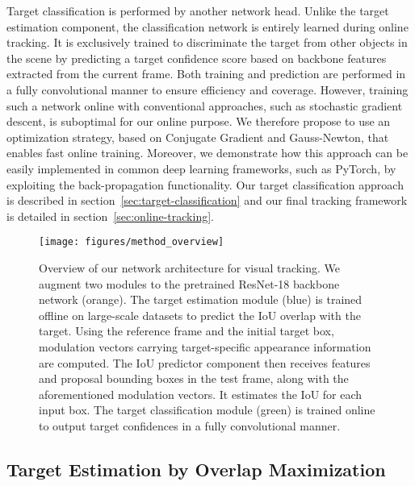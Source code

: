 \documentclass[10pt,twocolumn,letterpaper]{article}
\begin{document}
Target classification is performed by another network head. Unlike the target estimation component, the classification network is entirely learned during online tracking. It is exclusively trained to discriminate the target from other objects in the scene by predicting a target confidence score based on backbone features extracted from the current frame. Both training and prediction are performed in a fully convolutional manner to ensure efficiency and coverage. However, training such a network online with conventional approaches, such as stochastic gradient descent, is suboptimal for our online purpose. We therefore propose to use an optimization strategy, based on Conjugate Gradient and Gauss-Newton, that enables fast online training. Moreover, we demonstrate how this approach can be easily implemented in common deep learning frameworks, such as PyTorch, by exploiting the back-propagation functionality. Our target classification approach is described in section~\ref{sec:target-classification} and our final tracking framework is detailed in section~\ref{sec:online-tracking}.

\begin{figure}[t]
	\centering \newcommand{\wid}{1.0\columnwidth}\texttt{[image: figures/method\_overview]}\vspace{-3mm}\caption{Overview of our network architecture for visual tracking. We augment two modules to the pretrained ResNet-18 backbone network (orange). The target estimation module (blue) is trained offline on large-scale datasets to predict the IoU overlap with the target. Using the reference frame and the initial target box, modulation vectors carrying target-specific appearance information are computed. The IoU predictor component then receives features and proposal bounding boxes in the test frame, along with the aforementioned modulation vectors. It estimates the IoU for each input box. The target classification module (green) is trained online to output target confidences in a fully convolutional manner.}\label{fig:method_overview}\vspace{-3mm}\end{figure}

\subsection{Target Estimation by Overlap Maximization}
\label{sec:target-estimation}
\end{document}
